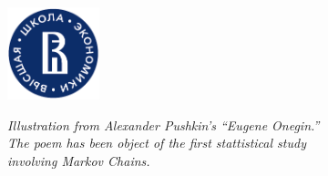 {\begin{titlepage}
\begin{center}
            \vfill

            \includegraphics[width=0.2\textwidth]{Logo_HSE.png}
        \end{center}
    \end{titlepage}
    
    \thispagestyle{empty}
    \vspace*{\fill}
    \begin{center}
        \begin{minipage}{0.8\textwidth}
            \centering
            \large\itshape
            Illustration from Alexander Pushkin's ``Eugene Onegin.''\\
            The poem has been object of the first stattistical study\\
	    involving Markov Chains. 
            \vspace{1cm}
        \end{minipage}
    \end{center}
    \vspace*{\fill}
    \clearpage
}
\makeatother


